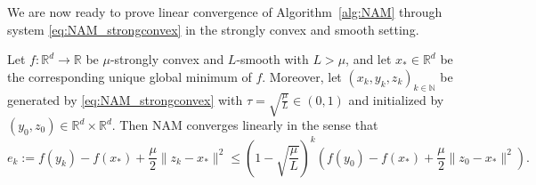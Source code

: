 \documentclass[12pt,openany]{book}
\theoremstyle{definition}
\theoremstyle{definition}
\newcommand{\N}{\mathbb{N}}
\newcommand{\R}{\mathbb{R}}
\begin{document}
We are now ready to prove linear convergence of Algorithm~\ref{alg:NAM} through system \eqref{eq:NAM_strongconvex} in the strongly convex and smooth setting.

\begin{thm} 
Let $f:\R^d\to\R$ be $\mu$-strongly convex and $L$-smooth with $L>\mu$, and let $x_\ast\in\R^d$ be the corresponding unique global minimum of $f$. Moreover, let $(x_k,y_k,z_k)_{k\in\N}$ be generated by \eqref{eq:NAM_strongconvex} with $\tau = \sqrt{\frac{\mu}{L}}\in(0,1)$ and initialized by $(y_0,z_0)\in\R^d\times\R^d$. Then {NAM} converges linearly in the sense that
\[e_k := f(y_k)-f(x_\ast) + \frac{\mu}{2}\|z_k-x_\ast\|^2 \le \left(1-\sqrt{\frac{\mu}{L}}\right)^k \left(f(y_0)-f(x_\ast) +\frac{\mu}{2}\|z_0-x_\ast\|^2\right). \]
\end{thm}
\end{document}
